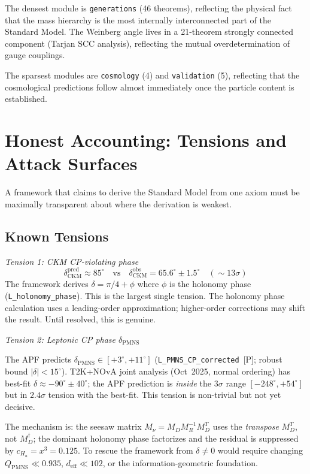\documentclass[11pt]{article}
\begin{document}
The densest module is \texttt{generations} (46 theorems), reflecting the physical fact that the mass hierarchy is the most internally interconnected part of the Standard Model.  The Weinberg angle lives in a 21-theorem strongly connected component (Tarjan SCC analysis), reflecting the mutual overdetermination of gauge couplings.

The sparsest modules are \texttt{cosmology} (4) and \texttt{validation} (5), reflecting that the cosmological predictions follow almost immediately once the particle content is established.


\section{Honest Accounting: Tensions and Attack Surfaces}
\label{sec:tensions}

A framework that claims to derive the Standard Model from one axiom must be maximally transparent about where the derivation is weakest.

\subsection{Known Tensions}

\textit{Tension 1: CKM CP-violating phase}
\[
\delta_{\mathrm{CKM}}^{\mathrm{pred}} \approx 85^\circ \quad\text{vs}\quad \delta_{\mathrm{CKM}}^{\mathrm{obs}} = 65.6^\circ \pm 1.5^\circ \quad(\sim\!13\sigma)
\]
The framework derives $\delta = \pi/4 + \phi$ where $\phi$ is the holonomy phase (\texttt{L\_holonomy\_phase}).  This is the largest single tension.  The holonomy phase calculation uses a leading-order approximation; higher-order corrections may shift the result.  Until resolved, this is genuine.

\textit{Tension 2: Leptonic CP phase $\delta_{\mathrm{PMNS}}$}

The APF predicts $\delta_{\mathrm{PMNS}} \in [+3^\circ, +11^\circ]$ (\texttt{L\_PMNS\_CP\_corrected}~[P]; robust bound $|\delta| < 15^\circ$).  T2K+NOvA joint analysis (Oct~2025, normal ordering) has best-fit $\delta \approx -90^\circ \pm 40^\circ$; the APF prediction is \emph{inside} the 3$\sigma$ range $[-248^\circ, +54^\circ]$ but in $2.4\sigma$ tension with the best-fit.  This tension is non-trivial but not yet decisive.

The mechanism is: the seesaw matrix $M_\nu = M_D M_R^{-1} M_D^T$ uses the \emph{transpose} $M_D^T$, not $M_D^\dagger$; the dominant holonomy phase factorizes and the residual is suppressed by $c_{H_u} = x^3 = 0.125$.  To rescue the framework from $\delta \ne 0$ would require changing $Q_{\mathrm{PMNS}} \ll 0.935$, $d_{\mathrm{eff}} \ll 102$, or the information-geometric foundation.
\end{document}
